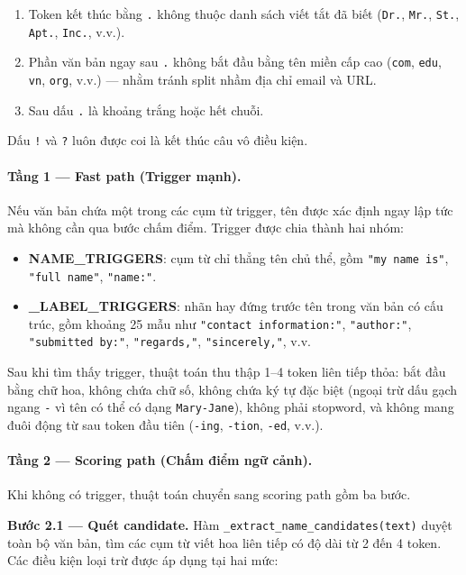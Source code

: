 \begin{enumerate}[nosep]
    \item Token kết thúc bằng \texttt{.} không thuộc danh sách viết tắt đã biết
          (\texttt{Dr.}, \texttt{Mr.}, \texttt{St.}, \texttt{Apt.}, \texttt{Inc.}, v.v.).
    \item Phần văn bản ngay sau \texttt{.} không bắt đầu bằng tên miền cấp cao
          (\texttt{com}, \texttt{edu}, \texttt{vn}, \texttt{org}, v.v.) --- nhằm
          tránh split nhầm địa chỉ email và URL.
    \item Sau dấu \texttt{.} là khoảng trắng hoặc hết chuỗi.
\end{enumerate}

Dấu \texttt{!} và \texttt{?} luôn được coi là kết thúc câu vô điều kiện.

\paragraph{Tầng 1 --- Fast path (Trigger mạnh).}
Nếu văn bản chứa một trong các cụm từ trigger, tên được xác định ngay lập tức
mà không cần qua bước chấm điểm. Trigger được chia thành hai nhóm:

\begin{itemize}[nosep]
    \item \textbf{NAME\_TRIGGERS}: cụm từ chỉ thẳng tên chủ thể, gồm
          \texttt{"my name is"}, \texttt{"full name"}, \texttt{"name:"}.
    \item \textbf{\_LABEL\_TRIGGERS}: nhãn hay đứng trước tên trong văn bản có
          cấu trúc, gồm khoảng 25 mẫu như \texttt{"contact information:"},
          \texttt{"author:"}, \texttt{"submitted by:"}, \texttt{"regards,"},
          \texttt{"sincerely,"}, v.v.
\end{itemize}

Sau khi tìm thấy trigger, thuật toán thu thập 1--4 token liên tiếp thỏa:
bắt đầu bằng chữ hoa, không chứa chữ số, không chứa ký tự đặc biệt (ngoại
trừ dấu gạch ngang \texttt{-} vì tên có thể có dạng \texttt{Mary-Jane}),
không phải stopword, và không mang đuôi động từ sau token đầu tiên
(\texttt{-ing}, \texttt{-tion}, \texttt{-ed}, v.v.).

\paragraph{Tầng 2 --- Scoring path (Chấm điểm ngữ cảnh).}
Khi không có trigger, thuật toán chuyển sang scoring path gồm ba bước.

\textbf{Bước 2.1 --- Quét candidate.}
Hàm \texttt{\_extract\_name\_candidates(text)} duyệt toàn bộ văn bản, tìm các
cụm từ viết hoa liên tiếp có độ dài từ 2 đến 4 token. Các điều kiện loại trừ
được áp dụng tại hai mức:

